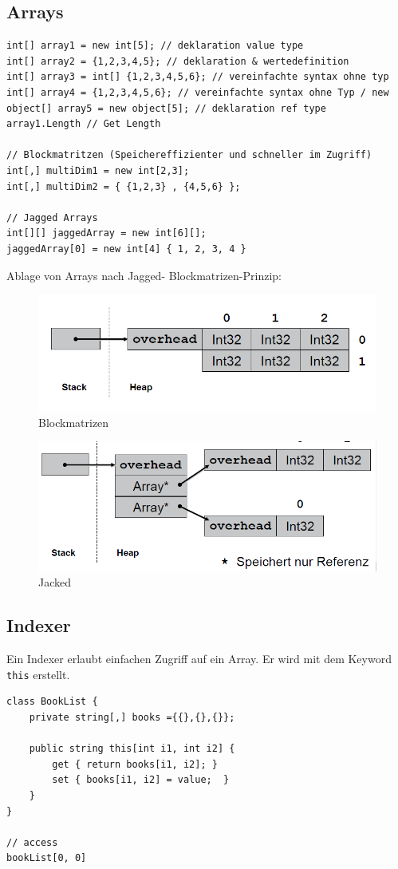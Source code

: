 \clearpage

\subsection{Arrays}
\begin{lstlisting}
int[] array1 = new int[5]; // deklaration value type
int[] array2 = {1,2,3,4,5}; // deklaration & wertedefinition
int[] array3 = int[] {1,2,3,4,5,6}; // vereinfachte syntax ohne typ
int[] array4 = {1,2,3,4,5,6}; // vereinfachte syntax ohne Typ / new
object[] array5 = new object[5]; // deklaration ref type
array1.Length // Get Length

// Blockmatritzen (Speichereffizienter und schneller im Zugriff)
int[,] multiDim1 = new int[2,3];
int[,] multiDim2 = { {1,2,3} , {4,5,6} };

// Jagged Arrays
int[][] jaggedArray = new int[6][];
jaggedArray[0] = new int[4] { 1, 2, 3, 4 }
\end{lstlisting}

Ablage von Arrays nach Jagged- Blockmatrizen-Prinzip:
\begin{figure}[h!]
\centering
\includegraphics[width=0.7\linewidth]{images/matrizenarray}
\caption{Blockmatrizen}
\label{fig:Blockmatrizen}
\end{figure}

\begin{figure}[h!]
\centering
\includegraphics[width=0.7\linewidth]{images/jaggedarray.png}
\caption{Jacked}
\label{fig:Jacked}
\end{figure}

\subsection{Indexer}
Ein Indexer erlaubt einfachen Zugriff auf ein Array. Er wird mit dem Keyword \lstinline|this| erstellt.
\begin{lstlisting}
class BookList {
	private string[,] books ={{},{},{}};

	public string this[int i1, int i2] {
		get { return books[i1, i2]; }
		set { books[i1, i2] = value;  } 
	}
}

// access
bookList[0, 0]
\end{lstlisting}

